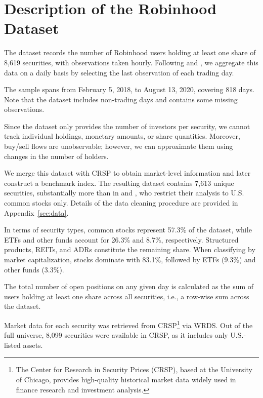 \section{Description of the Robinhood Dataset}
The dataset records the number of Robinhood users holding at least one share of 8,619 securities, with observations taken hourly. 
Following \cite{Welch2022} and \cite{Fedyk2024}, we aggregate this data on a daily basis by selecting the last observation of each trading day.

The sample spans from February 5, 2018, to August 13, 2020, covering 818 days. Note that the dataset includes non-trading days and contains some missing observations.

Since the dataset only provides the number of investors per security, we cannot track individual holdings, monetary amounts, or share quantities. 
Moreover, buy/sell flows are unobservable; however, we can approximate them using changes in the number of holders.

We merge this dataset with CRSP to obtain market-level information and later construct a benchmark index. 
The resulting dataset contains 7,613 unique securities, substantially more than in \cite{Fedyk2024} and \cite{Welch2022}, who restrict their analysis to U.S. common stocks only. 
Details of the data cleaning procedure are provided in Appendix~\ref{sec:data}.

In terms of security types, common stocks represent 57.3\% of the dataset, while ETFs and other funds account for 26.3\% and 8.7\%, respectively. 
Structured products, REITs, and ADRs constitute the remaining share. 
When classifying by market capitalization, stocks dominate with 83.1\%, followed by ETFs (9.3\%) and other funds (3.3\%).

The total number of open positions on any given day is calculated as the sum of users holding at least one share across all securities, i.e., a row-wise sum across the dataset.

Market data for each security was retrieved from CRSP\footnote{The Center for Research in Security Prices (CRSP), based at the University of Chicago, provides high-quality historical market data widely used in finance research and investment analysis.} via WRDS. 
Out of the full universe, 8,099 securities were available in CRSP, as it includes only U.S.-listed assets. 


